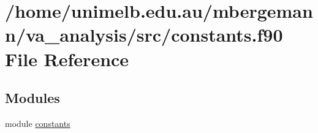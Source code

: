\hypertarget{constants_8f90}{}\section{/home/unimelb.edu.\+au/mbergemann/va\+\_\+analysis/src/constants.f90 File Reference}
\label{constants_8f90}
\subsection*{Modules}
\begin{DoxyCompactItemize}
\item 
module \hyperlink{namespaceconstants}{constants}
\end{DoxyCompactItemize}
